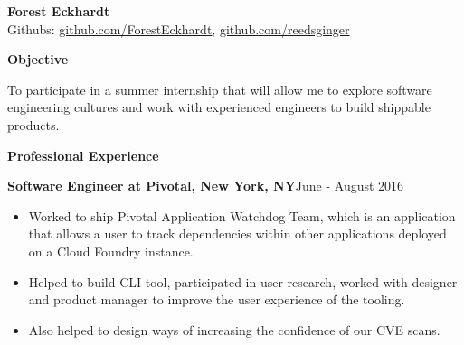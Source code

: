\documentclass[10pt,a4papaer]{article}
\begin{document}
{\selectfont
	
	\begin{center}	
		{\huge\textbf{Forest Eckhardt}} \\
		Githubs: \href{http://www.github.com/ForestEckhardt}{github.com/ForestEckhardt}, \href{http://www.github.com/reedsginger}{github.com/reedsginger}  \\
	\end{center}
	
	{\noindent\textbf{Objective}}\vspace*{-20px}\\
	
	\noindent\makebox[\linewidth]{\rule{\textwidth}{1.2pt}}
	
	\setlength{\leftskip}{15pt}
	
	{\noindent To participate in a summer internship that will allow me to explore software engineering cultures and work with experienced engineers to build shippable products.}\\
	
	\setlength{\leftskip}{0pt}
	
	{\noindent\textbf{Professional Experience}}\vspace*{-20px}\\
	
	\noindent\makebox[\linewidth]{\rule{\textwidth}{1.2pt}}
	
	\setlength{\leftskip}{15pt}
	
	{\noindent\textbf{Software Engineer at Pivotal, New York, NY}}{\hfill June - August 2016}
	
	\begin{itemize}[noitemsep, topsep=0pt]
		\item Worked to ship Pivotal Application Watchdog Team, which is an application that allows a user to track dependencies within other applications deployed on a Cloud Foundry instance. 
		\item Helped to build CLI tool, participated in user research, worked with designer and product manager to improve the user experience of the tooling. \item Also helped to design ways of increasing the confidence of our CVE scans.\\
	\end{itemize}
	
}
\end{document}
